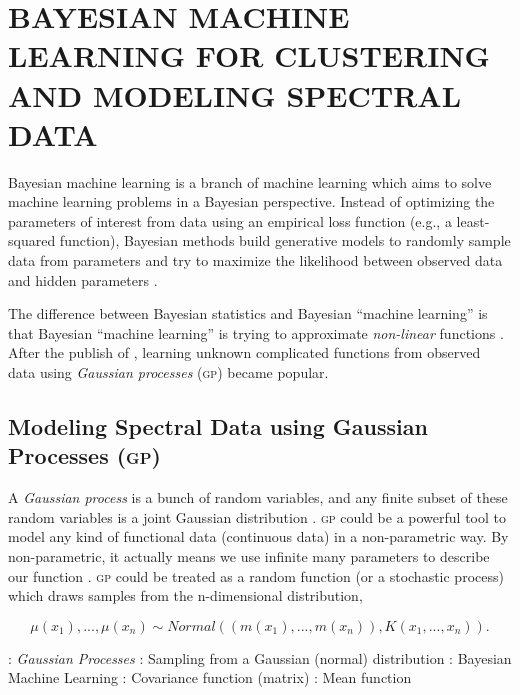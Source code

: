 \documentclass{ar-1col}
\begin{document}
\section{BAYESIAN MACHINE LEARNING FOR CLUSTERING AND MODELING SPECTRAL DATA}

Bayesian machine learning is a branch of machine learning which aims to solve machine learning problems in a Bayesian perspective. 
Instead of optimizing the parameters of interest from data using an empirical loss function (e.g., a least-squared function), Bayesian methods build generative models to randomly sample data from parameters and try to maximize the likelihood between observed data and hidden parameters \citep{Barber2012}.

The difference between Bayesian statistics and Bayesian ``machine learning'' is that Bayesian ``machine learning'' is trying to approximate {\it non-linear} functions \citep{Bishop2003}. 
After the publish of \citet{Rasmussen2005}, learning unknown complicated functions from observed data using {\it Gaussian processes} (\textsc{gp}) became popular. 

\subsection{Modeling Spectral Data using Gaussian Processes (\textsc{gp})}

A {\it Gaussian process} is a bunch of random variables, and any finite subset of these random variables is a joint Gaussian distribution \citep{Rasmussen2005}. \textsc{gp} could be a powerful tool to model any kind of functional data (continuous data) in a non-parametric way. 
By non-parametric, it actually means we use infinite many parameters to describe our function \citep{Gelman04}. \textsc{gp} could be treated as a random function (or a stochastic process) which draws samples from the n-dimensional distribution, 

\begin{equation}
    \mu(x_1), ..., \mu(x_n) \sim Normal((m(x_1), ..., m(x_n)), K(x_1, ..., x_n)).
    \label{eq:GP}
\end{equation}

\begin{marginnote}[120pt]
    : \textit{Gaussian Processes}
    : Sampling from a Gaussian (normal) distribution
    : Bayesian Machine Learning    
    : Covariance function (matrix)
    \entry{$\mu$}: Mean function
\end{marginnote} 
\end{document}

